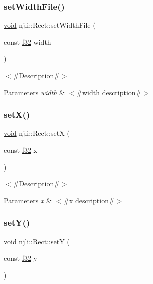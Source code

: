 \subsubsection{\texorpdfstring{set\+Width\+File()}{setWidthFile()}}
{\footnotesize\ttfamily \mbox{\hyperlink{_thread_8h_af1e856da2e658414cb2456cb6f7ebc66}{void}} njli\+::\+Rect\+::set\+Width\+File (\begin{DoxyParamCaption}\item[{const \mbox{\hyperlink{_util_8h_a5f6906312a689f27d70e9d086649d3fd}{f32}}}]{width }\end{DoxyParamCaption})}

$<$\#\+Description\#$>$


\begin{DoxyParams}{Parameters}
{\em width} & $<$\#width description\#$>$ \\
\hline
\end{DoxyParams}
\mbox{\label{classnjli_1_1_rect_a25efd75622840e4ed4c82f8f8a1e17c3}} 
\subsubsection{\texorpdfstring{set\+X()}{setX()}}
{\footnotesize\ttfamily \mbox{\hyperlink{_thread_8h_af1e856da2e658414cb2456cb6f7ebc66}{void}} njli\+::\+Rect\+::setX (\begin{DoxyParamCaption}\item[{const \mbox{\hyperlink{_util_8h_a5f6906312a689f27d70e9d086649d3fd}{f32}}}]{x }\end{DoxyParamCaption})}

$<$\#\+Description\#$>$


\begin{DoxyParams}{Parameters}
{\em x} & $<$\#x description\#$>$ \\
\hline
\end{DoxyParams}
\mbox{\label{classnjli_1_1_rect_a5606d634e931e9f9c933a5f51f128f9c}} 
\subsubsection{\texorpdfstring{set\+Y()}{setY()}}
{\footnotesize\ttfamily \mbox{\hyperlink{_thread_8h_af1e856da2e658414cb2456cb6f7ebc66}{void}} njli\+::\+Rect\+::setY (\begin{DoxyParamCaption}\item[{const \mbox{\hyperlink{_util_8h_a5f6906312a689f27d70e9d086649d3fd}{f32}}}]{y }\end{DoxyParamCaption})}


